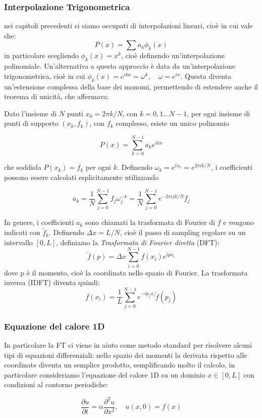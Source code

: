 \subsubsection{Interpolazione Trigonometrica}
nei capitoli precedenti ci siamo occupati di interpolazioni lineari, cioè in cui vale che:
\[
P(x) = \sum a_k \phi_k(x)
\]
in particolare scegliendo $\phi_k(x) = x^k$, cioè definendo un'interpolazione polinomiale. Un'alternativa a questo approccio è data da un'interpolazione trigonometrica, cioè in cui $\phi_k(x) = e^{ikx} = \omega^k, \quad \omega = e^{ix}$. Questa diventa un'estensione complessa della base dei monomi, permettendo di estendere anche il teorema di unicità, che affermava:

\bigskip
\noindent Dato l'insieme di $N$ punti $x_k = 2\pi k/N$, con $k = 0, 1 \dots N - 1$, per ogni insieme di punti di supporto $(x_k, f_k)$, con $f_k$ complesso, esiste un unico polinomio

\[
P(x) = \sum_{k=0}^{N-1} a_k e^{ikx}
\]

\noindent che soddisfa $P(x_k) = f_k$ per ogni $k$. Definendo $\omega_k = e^{ix_k} = e^{2\pi i k/N}$, i coefficienti possono essere calcolati esplicitamente utilizzando

\[
a_k = \frac{1}{N} \sum_{j=0}^{N-1} f_j \omega_j^{-k} = \frac{1}{N} \sum_{j=0}^{N-1} e^{-2\pi ijk/N} f_j
\]

\noindent In genere, i coefficienti $a_k$ sono chiamati la trasformata di Fourier di $f$ e vengono indicati con $\tilde{f}_k$.
Definendo $\Delta x = L/N$, cioè il passo di sampling regolare su un intervallo $[0, L]$, definiamo la \textit{Trasformata di Fourier diretta} (DFT):
\[
\tilde{f}(p) = \Delta x \sum_{i=0}^{N-1} f(x_i) e^{ipx_i}
\]
dove p è il momento, cioè la coordinata nello spazio di Fourier. La trasformata inversa (IDFT) diventa quindi:
\[
f(x_i) = \frac{1}{L} \sum_{j=0}^{N-1} e^{-ip_j x_i} \tilde{f}(p_j)
\]

\subsubsection{Equazione del calore 1D}
In particolare la FT ci viene in aiuto come metodo standard per risolvere alcuni tipi di equazioni differenziali: nello spazio dei momenti la derivata rispetto alle coordinate diventa un semplice prodotto, semplificando molto il calcolo, in particolare consideriamo l'equazione del calore 1D su un dominio $x \in [0, L]$ con condizioni al contorno periodiche:

\begin{equation} \label{eq: Heat eq}
\frac{\partial u}{\partial t} = \alpha \frac{\partial^2 u}{\partial x^2}, \quad u(x, 0) = f(x)
\end{equation}

